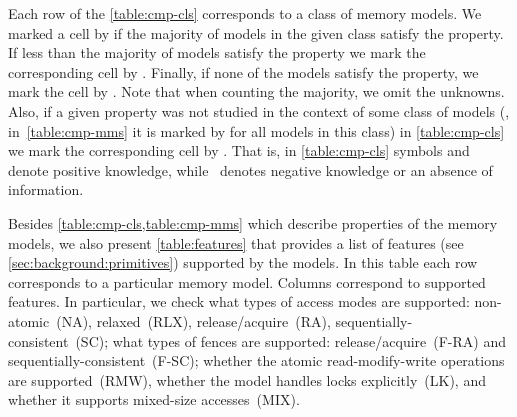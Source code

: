 Each row of the \cref{table:cmp-cls} corresponds to a class of memory models. 
We marked a cell by \cmark\xspace if the majority of models 
in the given class satisfy the property. 
If less than the majority of models satisfy the property we mark 
the corresponding cell by \wmark\xspace.
Finally, if none of the models satisfy the property, we mark the cell by \xmark\xspace. 
Note that when counting the majority, we omit the unknowns.
Also, if a given property was not studied in the context of some class of models 
(\ie, in~\cref{table:cmp-mms} it is marked by \qmark\xspace for all models in this class)
in \cref{table:cmp-cls} we mark the corresponding cell by \xmark. 
That is, in \cref{table:cmp-cls} symbols \cmark\xspace and \wmark\xspace 
denote positive knowledge,
while~\xmark\xspace denotes negative knowledge or
an absence of information.

Besides \cref{table:cmp-cls,table:cmp-mms} which describe 
properties of the memory models, 
we also present \cref{table:features}
that provides a list of features (see \cref{sec:background:primitives}) 
supported by the models.
In this table each row corresponds to a particular memory model. 
Columns correspond to supported features. 
In particular, we check what types of access modes are supported:
non-atomic~(NA), relaxed~(RLX), release/acquire~(RA), sequentially-consistent~(SC); 
what types of fences are supported: release/acquire~(F-RA) 
and sequentially-consistent~(F-SC);
whether the atomic read-modify-write operations are supported~(RMW),
whether the model handles locks explicitly~(LK),
and whether it supports mixed-size accesses~(MIX). 





